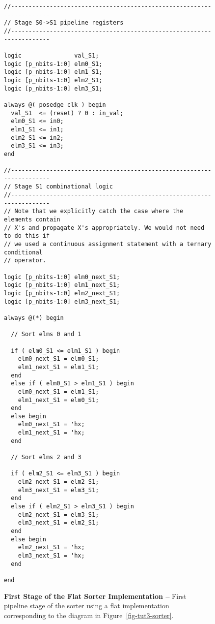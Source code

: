 
\begin{figure}

\begin{lstlisting}
//----------------------------------------------------------------------
// Stage S0->S1 pipeline registers
//----------------------------------------------------------------------

logic               val_S1;
logic [p_nbits-1:0] elm0_S1;
logic [p_nbits-1:0] elm1_S1;
logic [p_nbits-1:0] elm2_S1;
logic [p_nbits-1:0] elm3_S1;

always @( posedge clk ) begin
  val_S1  <= (reset) ? 0 : in_val;
  elm0_S1 <= in0;
  elm1_S1 <= in1;
  elm2_S1 <= in2;
  elm3_S1 <= in3;
end

//----------------------------------------------------------------------
// Stage S1 combinational logic
//----------------------------------------------------------------------
// Note that we explicitly catch the case where the elements contain
// X's and propagate X's appropriately. We would not need to do this if
// we used a continuous assignment statement with a ternary conditional
// operator.

logic [p_nbits-1:0] elm0_next_S1;
logic [p_nbits-1:0] elm1_next_S1;
logic [p_nbits-1:0] elm2_next_S1;
logic [p_nbits-1:0] elm3_next_S1;

always @(*) begin

  // Sort elms 0 and 1

  if ( elm0_S1 <= elm1_S1 ) begin
    elm0_next_S1 = elm0_S1;
    elm1_next_S1 = elm1_S1;
  end
  else if ( elm0_S1 > elm1_S1 ) begin
    elm0_next_S1 = elm1_S1;
    elm1_next_S1 = elm0_S1;
  end
  else begin
    elm0_next_S1 = 'hx;
    elm1_next_S1 = 'hx;
  end

  // Sort elms 2 and 3

  if ( elm2_S1 <= elm3_S1 ) begin
    elm2_next_S1 = elm2_S1;
    elm3_next_S1 = elm3_S1;
  end
  else if ( elm2_S1 > elm3_S1 ) begin
    elm2_next_S1 = elm3_S1;
    elm3_next_S1 = elm2_S1;
  end
  else begin
    elm2_next_S1 = 'hx;
    elm3_next_S1 = 'hx;
  end

end
\end{lstlisting}

  \caption{\textbf{First Stage of the Flat Sorter Implementation --}
    First pipeline stage of the sorter using a flat implementation
    corresponding to the diagram in Figure~\ref{fig-tut3-sorter}.}
  \label{code-tut3-sorter-flat}

\end{figure}

